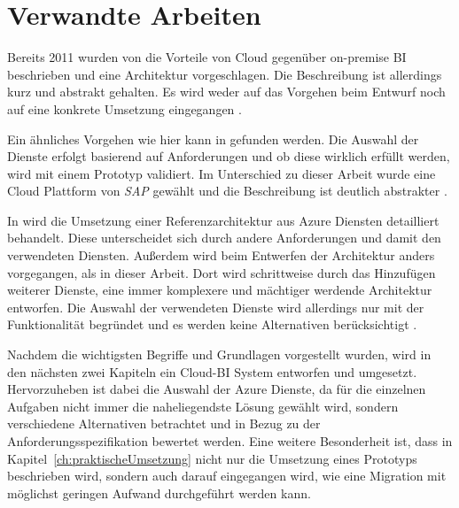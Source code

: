 \section{Verwandte Arbeiten} \label{ch:verwandteArbeiten}
Bereits 2011 wurden von \citeauthor{ouf_cloud_2011} die Vorteile von Cloud gegenüber on-premise BI beschrieben und eine Architektur vorgeschlagen. Die Beschreibung ist allerdings kurz und abstrakt gehalten. Es wird weder auf das Vorgehen beim Entwurf noch auf eine konkrete Umsetzung eingegangen \cite[vgl.][]{ouf_cloud_2011}.

Ein ähnliches Vorgehen wie hier kann in  gefunden werden. Die Auswahl der Dienste erfolgt basierend auf Anforderungen und ob diese wirklich erfüllt werden, wird mit einem Prototyp validiert. Im Unterschied zu dieser Arbeit wurde eine Cloud Plattform von \textit{SAP} gewählt und die Beschreibung ist deutlich abstrakter \cite[vgl.][]{oliver_norkus_rabic_2016}.

In  wird die Umsetzung einer Referenzarchitektur aus Azure Diensten detailliert behandelt. Diese unterscheidet sich durch andere Anforderungen und damit den verwendeten Diensten. Außerdem wird beim Entwerfen der Architektur anders vorgegangen, als in dieser Arbeit. Dort wird schrittweise durch das Hinzufügen weiterer Dienste, eine immer komplexere und mächtiger werdende Architektur entworfen. Die Auswahl der verwendeten Dienste wird allerdings nur mit der Funktionalität begründet und es werden keine Alternativen berücksichtigt \cite[vgl.][]{borosch_cloud_2021}.

Nachdem die wichtigsten Begriffe und Grundlagen vorgestellt wurden, wird in den nächsten zwei Kapiteln ein Cloud-BI System entworfen und umgesetzt. Hervorzuheben ist dabei die Auswahl der Azure Dienste, da für die einzelnen Aufgaben nicht immer die naheliegendste Lösung gewählt wird, sondern verschiedene Alternativen betrachtet und in Bezug zu der Anforderungsspezifikation bewertet werden. Eine weitere Besonderheit ist, dass in Kapitel~\ref{ch:praktischeUmsetzung} nicht nur die Umsetzung eines Prototyps beschrieben wird, sondern auch darauf eingegangen wird, wie eine Migration mit möglichst geringen Aufwand durchgeführt werden kann.